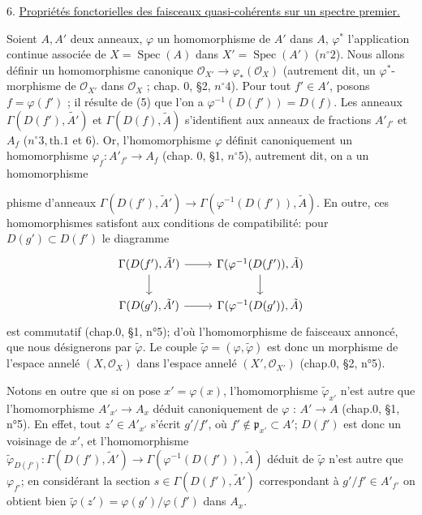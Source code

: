 6. \underline{Propriétés fonctorielles des faisceaux quasi-cohérents sur un spectre premier.}

Soient $A, A'$ deux anneaux, $\varphi$ un homomorphisme de $A'$ dans $A$, $\varphi^*$ l'application continue associée de $X = \operatorname{Spec}(A)$ dans $X' = \operatorname{Spec}(A')$ ($n^\circ 2$). Nous allons définir un homomorphisme canonique $\mathcal{O}_{X'} \to \varphi_*(\mathcal{O}_X)$ (autrement dit, un $\varphi^*$-morphisme de $\mathcal{O}_{X'}$ dans $\mathcal{O}_X$ ; chap. 0, \S 2, $n^\circ 4$). Pour tout $f' \in A'$, posons $f = \varphi(f')$ ; il résulte de (5) que l'on a $\varphi^{-1}(D(f')) = D(f)$. Les anneaux $\Gamma(D(f'), \widetilde{A'})$ et $\Gamma(D(f), \widetilde{A})$ s'identifient aux anneaux de fractions $A'_{f'}$ et $A_f$ ($n^\circ 3, \text{th.} 1$ et  6). Or, l'homomorphisme $\varphi$ définit canoniquement un homomorphisme $\varphi_f : A'_{f'} \to A_f$ (chap. 0, \S 1, $n^\circ 5$), autrement dit, on a un homomorphisme

\newpage


phisme d'anneaux $\Gamma(D(f'), \tilde{A}') \to \Gamma(\varphi^{-1}(D(f')), \tilde{A})$. En outre, ces homomorphismes satisfont aux conditions de compatibilité: pour $D(g') \subset D(f')$ le diagramme
$$
\begin{tikzcd}
\Gamma(D(f'), \tilde{A}') \arrow[r] \arrow[d] & \Gamma(\varphi^{-1}(D(f')), \tilde{A}) \arrow[d] \\
\Gamma(D(g'), \tilde{A}') \arrow[r] & \Gamma(\varphi^{-1}(D(g')), \tilde{A})
\end{tikzcd}
$$
est commutatif (chap.0, §1, n°5); d'où l'homomorphisme de faisceaux annoncé, que nous désignerons par $\tilde{\varphi}$. Le couple $\tilde{\varphi} = (\varphi, \tilde{\varphi})$ est donc un morphisme de l'espace annelé $(X, \mathcal{O}_X)$ dans l'espace annelé $(X', \mathcal{O}_{X'})$ (chap.0, §2, n°5).

Notons en outre que si on pose $x' = \varphi(x)$, l'homomorphisme $\tilde{\varphi}_{x'}$ n'est autre que l'homomorphisme $A'_{x'} \to A_x$ déduit canoniquement de $\varphi$ : $A' \to A$ (chap.0, §1, n°5). En effet, tout $z' \in A'_{x'}$ s'écrit $g'/f'$, où $f' \notin \mathfrak{p}_{x'} \subset A'$; $D(f')$ est donc un voisinage de $x'$, et l'homomorphisme $\tilde{\varphi}_{D(f')} : \Gamma(D(f'), \tilde{A}') \to \Gamma(\varphi^{-1}(D(f')), \tilde{A})$ déduit de $\tilde{\varphi}$ n'est autre que $\varphi_{f'}$; en considérant la section $s \in \Gamma(D(f'), \tilde{A}')$ correspondant à $g'/f' \in A'_{f'}$ on obtient bien $\tilde{\varphi}(z') = \varphi(g')/\varphi(f')$ dans $A_x$.

